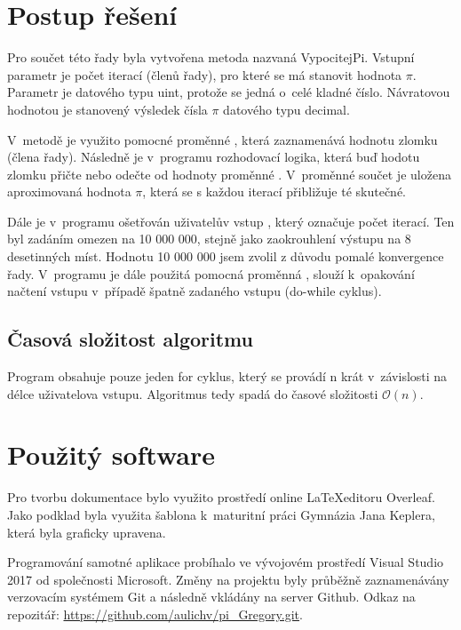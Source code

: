 \documentclass[11pt,a4paper]{report}
\begin{document}
	\section{Postup řešení}
	Pro součet této řady byla vytvořena metoda nazvaná VypocitejPi. Vstupní parametr je počet iterací (členů řady), pro které se má stanovit hodnota $\pi$. Parametr je datového typu uint, protože se jedná o~celé kladné číslo. Návratovou hodnotou je stanovený výsledek čísla $\pi$ datového typu decimal.
	
	V~metodě je využito pomocné proměnné , která zaznamenává hodnotu zlomku (člena řady). Následně je v~programu rozhodovací logika, která buď hodotu zlomku přičte nebo odečte od hodnoty proměnné . V~proměnné součet je uložena aproximovaná hodnota $\pi$, která se s každou iterací přibližuje té skutečné.
	
	Dále je v~programu ošetřován uživatelův vstup , který označuje počet iterací. Ten byl zadáním omezen na 10 000 000, stejně jako zaokrouhlení výstupu na 8 desetinných míst. Hodnotu 10 000 000 jsem zvolil z důvodu pomalé konvergence řady. V~programu je dále použitá pomocná proměnná , slouží k~opakování načtení vstupu v~případě špatně zadaného vstupu (do-while cyklus).
	
	\subsection{Časová složitost algoritmu}
	Program obsahuje pouze jeden for cyklus, který se provádí n krát v~závislosti na délce uživatelova vstupu. Algoritmus tedy spadá do časové složitosti $\mathcal{O}(n)$.
	
	\section{Použitý software}
	Pro tvorbu dokumentace bylo využito prostředí online \LaTeX editoru Overleaf. Jako podklad byla využita šablona k~maturitní práci Gymnázia Jana Keplera, která byla graficky upravena.
	
	Programování samotné aplikace probíhalo ve vývojovém prostředí Visual Studio 2017 od společnosti Microsoft. Změny na projektu byly průběžně zaznamenávány verzovacím systémem Git a následně vkládány na server Github. Odkaz na repozitář: \url{https://github.com/aulichv/pi_Gregory.git}.
	
	\clearpage
\end{document}
